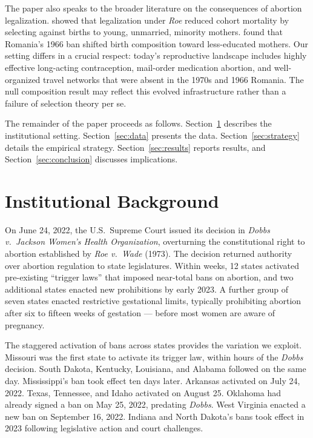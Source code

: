 \documentclass[12pt]{article}
\begin{document}
The paper also speaks to the broader literature on the consequences of abortion legalization. \citet{gruber1999abortion} showed that legalization under \emph{Roe} reduced cohort mortality by selecting against births to young, unmarried, minority mothers. \citet{pop2006effects} found that Romania's 1966 ban shifted birth composition toward less-educated mothers. Our setting differs in a crucial respect: today's reproductive landscape includes highly effective long-acting contraception, mail-order medication abortion, and well-organized travel networks that were absent in the 1970s and 1966 Romania. The null composition result may reflect this evolved infrastructure rather than a failure of selection theory per se.

The remainder of the paper proceeds as follows. Section~\ref{sec:background} describes the institutional setting. Section~\ref{sec:data} presents the data. Section~\ref{sec:strategy} details the empirical strategy. Section~\ref{sec:results} reports results, and Section~\ref{sec:conclusion} discusses implications.


\section{Institutional Background}
\label{sec:background}

On June 24, 2022, the U.S.\ Supreme Court issued its decision in \emph{Dobbs v.\ Jackson Women's Health Organization}, overturning the constitutional right to abortion established by \emph{Roe v.\ Wade} (1973). The decision returned authority over abortion regulation to state legislatures. Within weeks, 12 states activated pre-existing ``trigger laws'' that imposed near-total bans on abortion, and two additional states enacted new prohibitions by early 2023. A further group of seven states enacted restrictive gestational limits, typically prohibiting abortion after six to fifteen weeks of gestation --- before most women are aware of pregnancy.

The staggered activation of bans across states provides the variation we exploit. Missouri was the first state to activate its trigger law, within hours of the \emph{Dobbs} decision. South Dakota, Kentucky, Louisiana, and Alabama followed on the same day. Mississippi's ban took effect ten days later. Arkansas activated on July 24, 2022. Texas, Tennessee, and Idaho activated on August 25. Oklahoma had already signed a ban on May 25, 2022, predating \emph{Dobbs}. West Virginia enacted a new ban on September 16, 2022. Indiana and North Dakota's bans took effect in 2023 following legislative action and court challenges.
\end{document}
